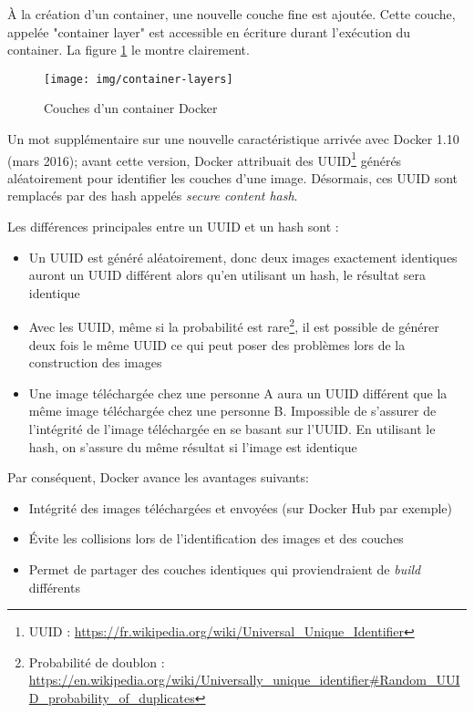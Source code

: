 À la création d'un container, une nouvelle couche fine est ajoutée. Cette couche, appelée "container layer" est accessible en écriture durant l'exécution du container. La figure \ref{docker-container-layers} le montre clairement.

\begin{figure}[hbtp]
\centering
\texttt{[image: img/container-layers]}
\caption{Couches d'un container Docker}
\label{docker-container-layers}
\end{figure}

Un mot supplémentaire sur une nouvelle caractéristique arrivée avec Docker 1.10 (mars 2016); avant cette version, Docker attribuait des UUID\footnote{UUID : \url{https://fr.wikipedia.org/wiki/Universal_Unique_Identifier}} générés aléatoirement pour identifier les couches d'une image. Désormais, ces UUID sont remplacés par des hash appelés \textit{secure content hash}.

Les différences principales entre un UUID et un hash sont :
\begin{itemize}
\item Un UUID est généré aléatoirement, donc deux images exactement identiques auront un UUID différent alors qu'en utilisant un hash, le résultat sera identique
\item Avec les UUID, même si la probabilité est rare\footnote{Probabilité de doublon : \url{https://en.wikipedia.org/wiki/Universally_unique_identifier\#Random_UUID_probability_of_duplicates}}, il est possible de générer deux fois le même UUID ce qui peut poser des problèmes lors de la construction des images
\item Une image téléchargée chez une personne A aura un UUID différent que la même image téléchargée chez une personne B. Impossible de s'assurer de l'intégrité de l'image téléchargée en se basant sur l'UUID. En utilisant le hash, on s'assure du même résultat si l'image est identique
\end{itemize}

\vspace{2mm}
Par conséquent, Docker avance les avantages suivants:
\begin{itemize}
\item Intégrité des images téléchargées et envoyées (sur Docker Hub par exemple)
\item Évite les collisions lors de l'identification des images et des couches
\item Permet de partager des couches identiques qui proviendraient de \textit{build} différents
\end{itemize}

